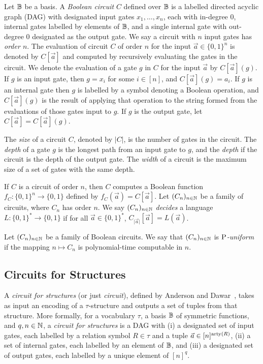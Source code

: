 \documentclass[../paper.tex]{subfiles}
\begin{document}
Let $\mathbb{B}$ be a basis. A \emph{Boolean circuit} $C$ defined over $\mathbb{B}$ is a
labelled directed acyclic graph (DAG) with designated input gates $x_1, \ldots,
x_n$, each with in-degree $0$, internal gates labelled by elements of $\mathbb{B}$, and
a single internal gate with out-degree $0$ designated as the output gate. We say
a circuit with $n$ input gates has \emph{order $n$}. The evaluation of circuit
$C$ of order $n$ for the input $\vec{a} \in \{0,1\}^n$ is denoted by
$C[\vec{a}]$ and computed by recursively evaluating the gates in the circuit. We
denote the evaluation of a gate $g$ in $C$ for the input $\vec{a}$ by
$C[\vec{a}](g)$. If $g$ is an input gate, then $g = x_i$ for some $i \in [n]$,
and $C[\vec{a}](g) = a_i$. If $g$ is an internal gate then $g$ is labelled by a
symbol denoting a Boolean operation, and $C[\vec{a}](g)$ is the result of
applying that operation to the string formed from the evaluations of those gates
input to $g$. If $g$ is the output gate, let $C[\vec{a}] = C[\vec{a}](g)$.

The \emph{size} of a circuit $C$, denoted by $\vert C \vert$, is the number of
gates in the circuit. The \emph{depth} of a gate $g$ is the longest path from an
input gate to $g$, and the \emph{depth} if the circuit is the depth of the
output gate. The \emph{width} of a circuit is the maximum size of a set of gates
with the same depth.

If $C$ is a circuit of order $n$, then $C$ computes a Boolean function $f_C :
\{0,1\}^n \rightarrow \{0,1\}$ defined by $f_C(\vec{a}) = C[\vec{a}]$. Let
$(C_n)_{n \in \mathbb{N}}$ be a family of circuits, where $C_n$ has order $n$. We say
$(C_n)_{n \in \mathbb{N}}$ \emph{decides} a language $L : \{0,1\}^{*} \rightarrow
\{0,1\}$ if for all $\vec{a} \in \{0,1\}^{*}$, $C_{\vert \vec{a} \vert}
[\vec{a}] = L(\vec{a})$.

\begin{definition}
  Let $(C_n)_{n \in \mathbb{N}}$ be a family of Boolean circuits. We say that
  $(C_n)_{n \in \mathbb{N}}$ is \emph{$\mathrm{P}$-uniform} if the mapping $n \mapsto C_n$
  is polynomial-time computable in $n$.
\end{definition}

\subsection{Circuits for Structures}
A \emph{circuit for structures} (or just \emph{circuit}), defined by Anderson
and Dawar~\cite{AndersonD17}, takes as input an encoding of a $\tau$-structure
and outputs a set of tuples from that structure. More formally, for a vocabulary
$\tau$, a basis $\mathbb{B}$ of symmetric functions, and $q, n \in \mathbb{N}$, a
\emph{circuit for structures} is a DAG with (i) a designated set of input gates,
each labelled by a relation symbol $R \in \tau$ and a tuple $\vec{a} \in
[n]^{\mathrm{arty}(R)}$, (ii) a set of internal gates, each labelled by an element of
$\mathbb{B}$, and (iii) a designated set of output gates, each labelled by a unique
element of $[n]^q$.
\end{document}
